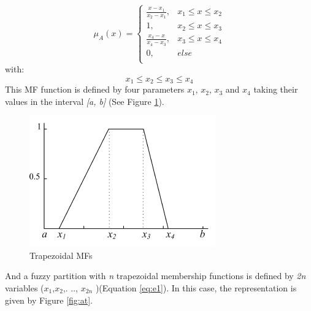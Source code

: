 \documentclass[10pt,journal,compsoc]{IEEEtran}
\begin{document}
\begin{equation}
	\mu_{A}(x)= \left \{
	\begin{array}{ll}
		\frac{x - x_{1}}{x_{2} - x_{1}},& x_{1} \leq x \leq x_{2}\\
		1 , &x_{2} \leq x \leq x_{3}\\
		\frac{x_{4} - x}{x_{4} - x_{3}},& x_{3} \leq x \leq x_{4}\\
		0        ,& else\\	
	\end{array}
	\right.
	\label{eq:trapmf}
\end{equation}
with:
\begin{equation}
	x_{1} \leq x_{2} \leq x_{3} \leq x_{4}
\end{equation}
This MF function is defined by four parameters $x_{1}$, $x_{2}$,
$x_{3}$ and $x_{4}$ taking their values in the interval \textit{[a,
	b]} (See Figure \ref{fig:trapeze}).

\begin{figure}[!ht] 
	\begin{center}
		\includegraphics[scale=0.8]{fig/trapese}
		\caption {Trapezoidal MFs}
		\label{fig:trapeze}
	\end{center}
\end{figure}
And a fuzzy partition with \textit{n} trapezoidal membership functions
is defined by \textit{2n} variables ($x_{1}$,$x_{2}
$,. .., $x_{2n} $ )(Equation \ref{eq:e1}). In this case,
the representation is given by Figure \ref{fig:at}.
\end{document}
